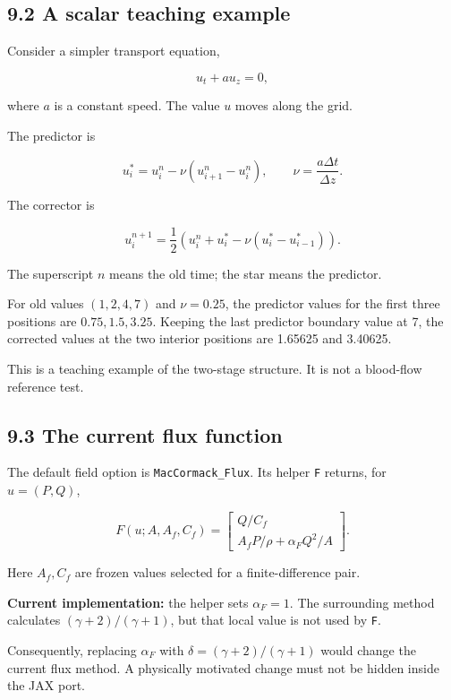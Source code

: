 \documentclass[11pt,a4paper]{article}
\begin{document}
\subsection{9.2 A scalar teaching example}
Consider a simpler transport equation,


\begingroup\small
\[
u_t+a u_z=0,
\]
\endgroup


where \(a\) is a constant speed. The value \(u\) moves along the grid.

The predictor is


\begingroup\small
\[
u_i^*=u_i^n
-\nu(u_{i+1}^n-u_i^n),
\qquad \nu=\frac{a\Delta t}{\Delta z}.
\]
\endgroup


The corrector is


\begingroup\small
\[
u_i^{n+1}
=\frac12\left(
u_i^n+u_i^*
-\nu(u_i^*-u_{i-1}^*)
\right).
\]
\endgroup


The superscript \(n\) means the old time; the star means the predictor.

For old values \((1,2,4,7)\) and \(\nu=0.25\), the predictor values for the first three positions are \(0.75,1.5,3.25\). Keeping the last predictor boundary value at 7, the corrected values at the two interior positions are 1.65625 and 3.40625.

This is a teaching example of the two-stage structure. It is not a blood-flow reference test.

\subsection{9.3 The current flux function}
The default field option is \texttt{MacCormack\_\allowbreak{}Flux}. Its helper \texttt{F} returns, for \(u=(P,Q)\),


\begingroup\small
\[
F(u;A,A_f,C_f)=
\begin{bmatrix}
Q/C_f\\
A_fP/\rho+\alpha_F Q^2/A
\end{bmatrix}.
\]
\endgroup


Here \(A_f,C_f\) are frozen values selected for a finite-difference pair.

\textbf{Current implementation:} the helper sets \(\alpha_F=1\). The surrounding method calculates \((\gamma+2)/(\gamma+1)\), but that local value is not used by \texttt{F}.

Consequently, replacing \(\alpha_F\) with \(\delta=(\gamma+2)/(\gamma+1)\) would change the current flux method. A physically motivated change must not be hidden inside the JAX port.
\end{document}
